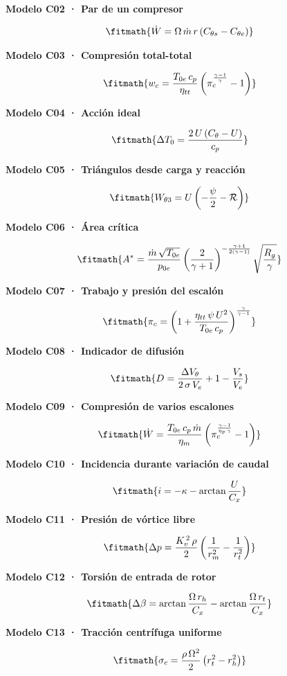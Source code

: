 \documentclass[10pt,openany]{book}
\begin{document}
\noindent\textbf{Modelo C02 · Par de un compresor}

\[
\fitmath{\dot W=\Omega\,\dot m\,r\,(C_{\theta s}-C_{\theta e})}
\]

\noindent\textbf{Modelo C03 · Compresión total-total}

\[
\fitmath{w_c=\frac{T_{0e}\,c_p}{\eta_{tt}}\left(\pi_c^{\frac{\gamma-1}{\gamma}}-1\right)}
\]

\noindent\textbf{Modelo C04 · Acción ideal}

\[
\fitmath{\Delta T_0=\frac{2\,U\,(C_\theta-U)}{c_p}}
\]

\noindent\textbf{Modelo C05 · Triángulos desde carga y reacción}

\[
\fitmath{W_{\theta 3}=U\left(-\frac{\psi}{2}-\mathcal R\right)}
\]

\noindent\textbf{Modelo C06 · Área crítica}

\[
\fitmath{A^*=\frac{\dot m\,\sqrt{T_{0e}}}{p_{0e}}\left(\frac{2}{\gamma+1}\right)^{-\frac{\gamma+1}{2(\gamma-1)}}\sqrt{\frac{R_g}{\gamma}}}
\]

\noindent\textbf{Modelo C07 · Trabajo y presión del escalón}

\[
\fitmath{\pi_c=\left(1+\frac{\eta_{tt}\,\psi\,U^2}{T_{0e}\,c_p}\right)^{\frac{\gamma}{\gamma-1}}}
\]

\noindent\textbf{Modelo C08 · Indicador de difusión}

\[
\fitmath{D=\frac{\Delta V_\theta}{2\,\sigma\,V_e}+1-\frac{V_s}{V_e}}
\]

\noindent\textbf{Modelo C09 · Compresión de varios escalones}

\[
\fitmath{\dot W=\frac{T_{0e}\,c_p\,\dot m}{\eta_m}\left(\pi_c^{\frac{\gamma-1}{\eta_p\,\gamma}}-1\right)}
\]

\noindent\textbf{Modelo C10 · Incidencia durante variación de caudal}

\[
\fitmath{i=-\kappa-\arctan\frac{U}{C_x}}
\]

\noindent\textbf{Modelo C11 · Presión de vórtice libre}

\[
\fitmath{\Delta p=\frac{K_v^{\,2}\,\rho}{2}\left(\frac{1}{r_m^2}-\frac{1}{r_t^2}\right)}
\]

\noindent\textbf{Modelo C12 · Torsión de entrada de rotor}

\[
\fitmath{\Delta\beta=\arctan\frac{\Omega\,r_h}{C_x}-\arctan\frac{\Omega\,r_t}{C_x}}
\]

\noindent\textbf{Modelo C13 · Tracción centrífuga uniforme}

\[
\fitmath{\sigma_c=\frac{\rho\,\Omega^2}{2}\left(r_t^2-r_h^2\right)}
\]
\end{document}
